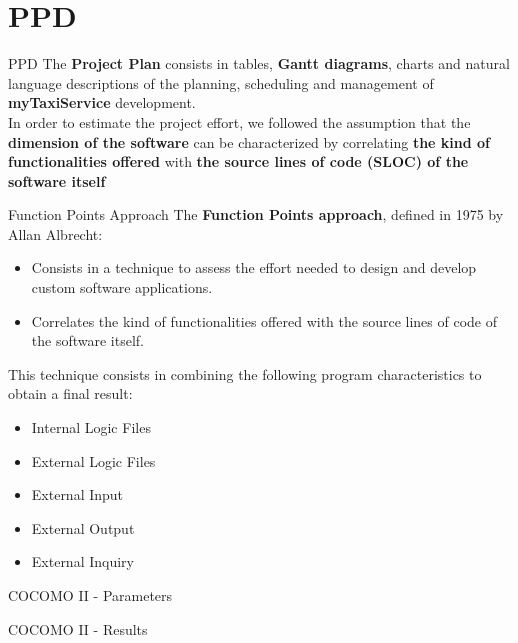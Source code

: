 \documentclass{../common/latex_classes/pdf_presentation}
\begin{document}
	\section{PPD}
	\begin{frame}{PPD}
		The \textbf{Project Plan} consists in tables, \textbf{Gantt diagrams}, charts and natural language descriptions of the planning, scheduling and management of \textbf{myTaxiService} development. \\
		\medskip
		In order to estimate the project effort, we followed the assumption that the \textbf{dimension of the software} can be characterized by correlating \textbf{the kind of functionalities offered} with \textbf{the source lines of code (SLOC) of the software itself}
	\end{frame}
	\begin{frame}{Function Points Approach}
		The \textbf{Function Points approach}, defined in 1975 by Allan Albrecht:
		\begin{itemize}
			\item Consists in a technique to assess the effort needed to design and develop custom software applications.
			\item Correlates the kind of functionalities offered with the source lines of code of the software itself.
		\end{itemize}
		\medskip
		This technique consists in combining the following program characteristics to obtain a final result:
		\begin{itemize}
			\item Internal Logic Files
			\item External Logic Files
			\item External Input
			\item External Output
			\item External Inquiry
		\end{itemize}
	\end{frame}
	\begin{frame}{COCOMO II - Parameters}
	\end{frame}
	\begin{frame}{COCOMO II - Results}
	\end{frame}	
\end{document}

